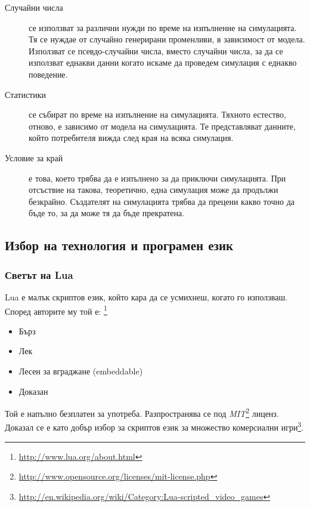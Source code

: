 \begin{description}
				\item[Случайни числа] се използват за различни нужди по време на изпълнение на симулацията.
				Тя се нуждае от случайно генерирани променливи, в зависимост от модела. 
				Използват се псевдо-случайни числа, вместо случайни числа, за да се използват
				еднакви данни когато искаме да проведем симулация с еднакво поведение.				
				
				\item[Статистики] се събират по време на изпълнение на симулацията. Тяхното естество, отново, е зависимо от модела
				на симулацията. Те представляват данните, който потребителя вижда след края на всяка симулация.				
				
				\item[Условие за край] е това, което трябва да е изпълнено за да приключи симулацията. 
				При отсъствие на такова, теоретично, една симулация може да продължи безкрайно.
				Създателят на симулацията трябва да прецени какво точно да бъде то, 
				за да може тя да бъде прекратена.
				
			\end{description}
	
	\subsection{Избор на технология и програмен език}
		\subsubsection{Светът на Lua}
		
			Lua е малък скриптов език, който кара да се усмихнеш, когато го използваш. 
			Според авторите му той е: \footnote{\url{http://www.lua.org/about.html}} 
			
			\begin{itemize}			
				\item Бърз				
				\item Лек				
				\item Лесен за вграджане (embeddable)				
				\item Доказан				
			\end{itemize}
			
			Той е напълно безплатен за употреба. Разпространява се под 
			\emph{MIT}\footnote{\url{http://www.opensource.org/licenses/mit-license.php}} лиценз. 
			Доказал се е като добър избор за скриптов език за множество комерсиални 
			игри\footnote{\url{http://en.wikipedia.org/wiki/Category:Lua-scripted_video_games}}.
			
